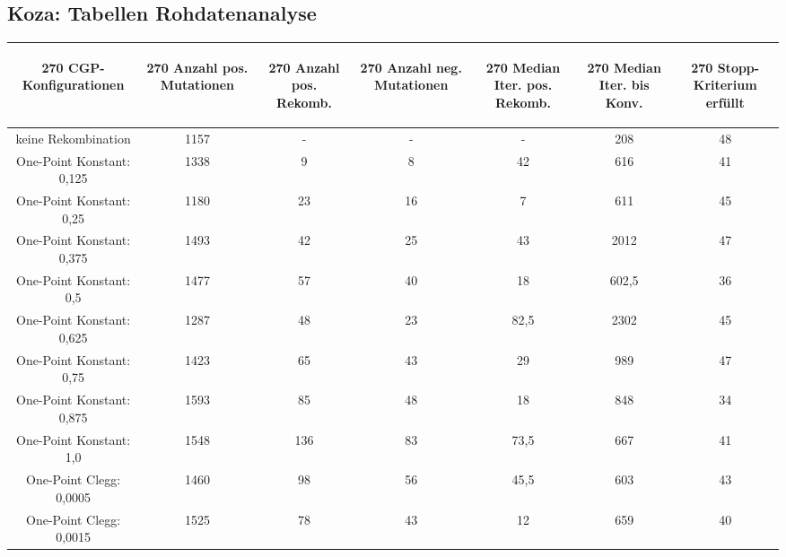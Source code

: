 \subsection{Koza: Tabellen Rohdatenanalyse}
\label{subsec:appendixTabellenRohdatenanalyseKoza}
 \begin{table}[H]
	\centering
	\begin{tabular}{c | c | c | c | c | c | c}
		\begin{turn}{270} \textbf{CGP-Konfigurationen} \end{turn} & \begin{turn}{270} \textbf{Anzahl pos. Mutationen} \end{turn} & \begin{turn}{270} \textbf{Anzahl pos. Rekomb.} \end{turn} & \begin{turn}{270} \textbf{Anzahl neg. Mutationen} \end{turn} & \begin{turn}{270} \textbf{Median Iter. pos. Rekomb.} \end{turn} & \begin{turn}{270} \textbf{Median Iter. bis Konv.} \end{turn} & \begin{turn}{270} \textbf{Stopp-Kriterium erfüllt} \end{turn}\\
		\hline
		keine Rekombination & 1157 & - & - & - & 208 & 48\\
		\hline
		\hline
		One-Point Konstant: 0,125 & 1338 & 9 & 8 & 42 & 616 & 41\\
		\hline
		One-Point Konstant: 0,25 & 1180 & 23 & 16 & 7 & 611 & 45\\
		\hline
		One-Point Konstant: 0,375 & 1493 & 42 & 25 & 43 & 2012 & 47\\
		\hline
		One-Point Konstant: 0,5 & 1477 & 57 & 40 & 18 & 602,5 & 36\\
		\hline
		One-Point Konstant: 0,625 & 1287 & 48 & 23 & 82,5 & 2302 & 45\\
		\hline
		One-Point Konstant: 0,75 & 1423 & 65 & 43 & 29 & 989 & 47\\
		\hline
		One-Point Konstant: 0,875 & 1593 & 85 & 48 & 18 & 848 & 34\\
		\hline
		One-Point Konstant: 1,0 & 1548 & 136 & 83 & 73,5 & 667 & 41\\
		\hline
		\hline
		One-Point Clegg: 0,0005 & 1460 & 98 & 56 & 45,5 & 603 & 43\\
		\hline
		One-Point Clegg: 0,0015 & 1525 & 78 & 43 & 12 & 659 & 40\\

\end{tabular}
\end{table}
